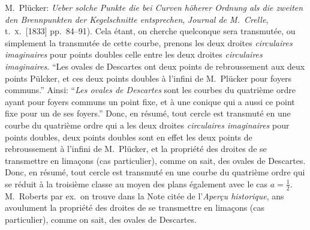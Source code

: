 \documentclass[11pt]{article}
\begin{document}
M.\ Pl\"ucker: \textit{Ueber solche Punkte die bei Curven h\"oherer Ordnung als die zweiten den Brennpunkten der Kegelschnitte entsprechen}, \textit{Journal de M.\ Crelle}, t.~\textsc{x}.\ [1833] pp.~84--91). Cela \'etant, on cherche quelconque sera transmut\'ee, ou simplement la transmut\'ee de cette courbe, prenons les deux droites \textit{circulaires imaginaires} pour points doubles celle entre les deux droites \textit{circulaires imaginaires}. ``Les ovales de Descartes ont deux points de rebroussement aux deux points P\"ulcker, et ces deux points doubles \`a l'infini de M.\ Pl\"ucker pour foyers communs.'' Ainsi: ``\textit{Les ovales de Descartes} sont les courbes du quatri\`eme ordre ayant pour foyers communs un point fixe, et \`a une conique qui a aussi ce point fixe pour un de ses foyers.'' Donc, en r\'esum\'e, tout cercle est transmut\'e en une courbe du quatri\`eme ordre qui a les deux droites \textit{circulaires imaginaires} pour points doubles, deux points doubles sont en effet les deux points de rebroussement \`a l'infini de M.\ Pl\"ucker, et la propri\'et\'e des droites de se transmettre en lima\c{c}ons (cas particulier), comme on sait, des ovales de Descartes. Donc, en r\'esum\'e, tout cercle est transmut\'e en une courbe du quatri\`eme ordre qui se r\'eduit \`a la troisi\`eme classe au moyen des plans \'egalement avec le cas $a = \tfrac{1}{2}$. M.\ Roberts par ex.\ on trouve dans la Note cit\'ee de l'\textit{Aper\c{c}u historique}, ans avoulument la propri\'et\'e des droites de se transmettre en lima\c{c}ons (cas particulier), comme on sait, des ovales de Descartes.

\end{document}
